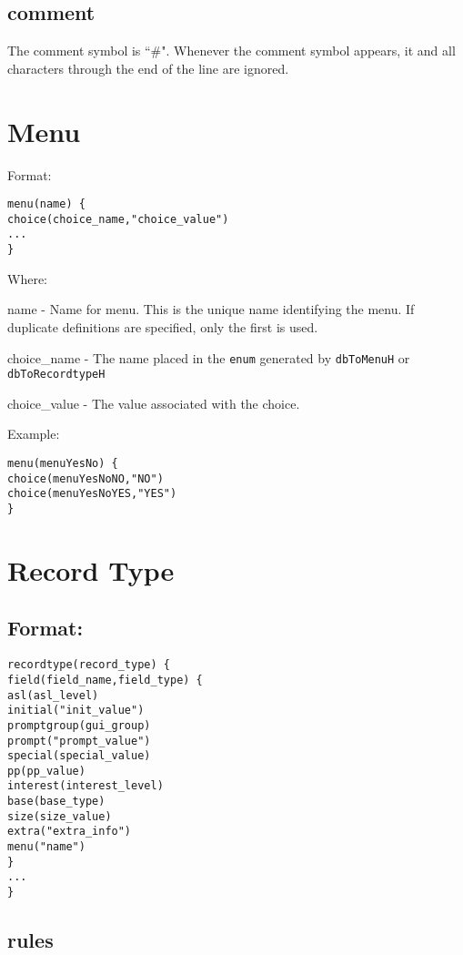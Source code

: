 \subsection{comment}

The comment symbol is ``\#". Whenever the comment symbol appears, it and all characters through the end of the line are 
ignored.

\section{Menu}

Format:

\begin{verbatim}menu(name) {
choice(choice_name,"choice_value")
...
}
\end{verbatim}Where:

\begin{description}\item name - Name for menu. This is the unique name identifying the menu. If duplicate definitions are specified, only 
the first is used.

\item choice\_name - The name placed in the \verb|enum| generated by \verb|dbToMenuH| or \verb|dbToRecordtypeH|

\item choice\_value - The value associated with the choice.

\end{description}Example:

\begin{verbatim}menu(menuYesNo) {
choice(menuYesNoNO,"NO")
choice(menuYesNoYES,"YES")
}
\end{verbatim}\section{Record Type}

\subsection{Format:}

\begin{verbatim}recordtype(record_type) {
field(field_name,field_type) {
asl(asl_level)
initial("init_value")
promptgroup(gui_group)
prompt("prompt_value")
special(special_value)
pp(pp_value)
interest(interest_level)
base(base_type)
size(size_value)
extra("extra_info")
menu("name")
}
...
}
\end{verbatim}\subsection{rules}

